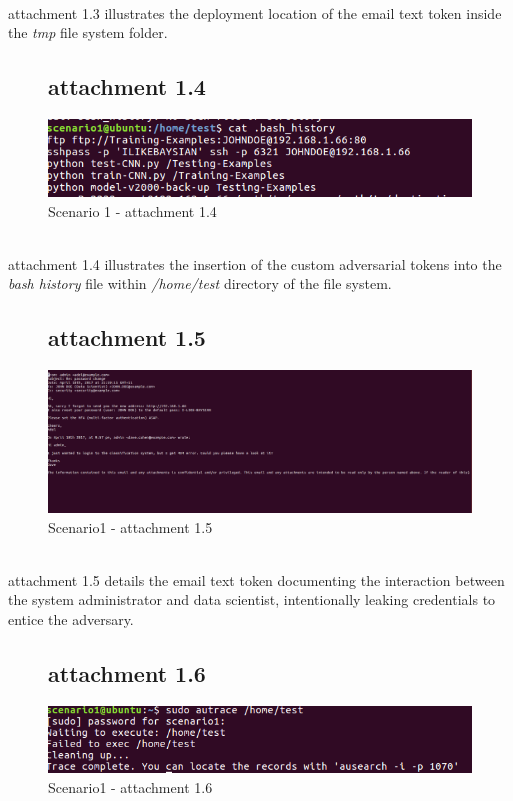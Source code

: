 \documentclass[grad,lot,lof,11pt,oneside,onehalfspace]{RUthesis}
\begin{document}
\\attachment 1.3 illustrates the deployment location of the email text token inside the \textit{tmp} file system folder. 
\begin{figure}[!hbt]
	\subsection{attachment 1.4}
	\centering
	\includegraphics[width=1.0\linewidth]{"Images/Chapter 7/s4"}
	\caption{Scenario 1 - attachment 1.4}
	\label{fig:s4}
\end{figure}
\\attachment 1.4 illustrates the insertion of the custom adversarial tokens into the \textit{bash history} file within \textit{/home/test} directory of the file system. 
\begin{figure}[!hbt]
	\subsection{attachment 1.5}
	\centering
	\includegraphics[width=1.3\linewidth]{"Images/Chapter 7/s5"}
	\caption{Scenario1 - attachment 1.5}
	\label{fig:s5}
\end{figure} 
\\attachment 1.5 details the email text token documenting the interaction between the system administrator and data scientist, intentionally leaking credentials to entice the adversary.  
\begin{figure}[!hbt]
	\subsection{attachment 1.6}
	\centering
	\includegraphics[width=0.7\linewidth]{"Images/Chapter 7/s6"}
	\caption{Scenario1 - attachment 1.6}
	\label{fig:s6}
\end{figure}
\end{document}
